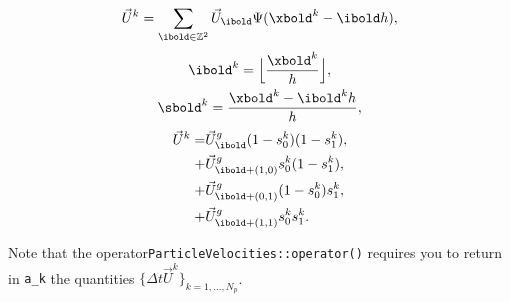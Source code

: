 \documentclass[11pt]{article}
\begin{document}
\begin{enumerate}
\begin{gather*}
\vec{U}^k = \sum \limits_{\ibold \in \mathbb{Z}^2} \vec{U}_\ibold \Psi(\xbold^k - \ibold h),
\end{gather*}
\begin{gather*}
\ibold^k = \Big \lfloor \frac{\xbold^k}{h} \Big \rfloor ,\\
\sbold^k =\frac{\xbold^k - \ibold^k h}{h},
\end{gather*}
\begin{align*}
\vec{U}^k = & \vec{U}^g_\ibold (1 - s^k_0)(1-s^k_1) ,\\
+ & \vec{U}^g_{\ibold + (1,0)} s^k_0 (1 - s^k_1) ,\\
+ & \vec{U}^g_{\ibold + (0,1)}(1 - s^k_0) s^k_1 ,\\
+ & \vec{U}^g_{\ibold + (1,1)} s^k_0 s^k_1 .
\end{align*}
\end{enumerate}
Note that the operator{\tt ParticleVelocities::operator()} requires you to return in {\tt a\_k} the quantities $\{\Delta t \vec{U}^k\} _{k = 1, \dots , N_p}$.
\end{document}
